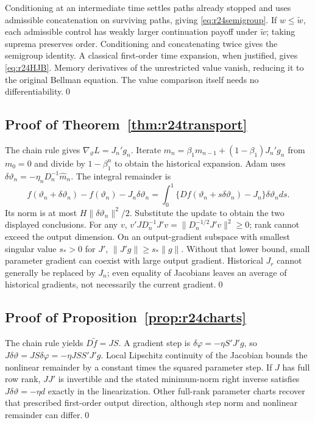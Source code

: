 Conditioning at an intermediate time settles paths already stopped and uses admissible concatenation on surviving paths, giving \eqref{eq:r24semigroup}. If $w\leq\widetilde w$, each admissible control has weakly larger continuation payoff under $\widetilde w$; taking suprema preserves order. Conditioning and concatenating twice gives the semigroup identity. A classical first-order time expansion, when justified, gives \eqref{eq:r24HJB}. Memory derivatives of the unrestricted value vanish, reducing it to the original Bellman equation. The value comparison itself needs no differentiability.\qed

\subsection{Proof of Theorem~\ref{thm:r24transport}}
The chain rule gives $\nabla_\vartheta L=J_n'g_n$. Iterate $m_n=\beta_1m_{n-1}+(1-\beta_1)J_n'g_n$ from $m_0=0$ and divide by $1-\beta_1^n$ to obtain the historical expansion. Adam uses $\delta\vartheta_n=-\eta_nD_n^{-1}\widehat m_n$. The integral remainder is
\[
 f(\vartheta_n+\delta\vartheta_n)-f(\vartheta_n)-J_n\delta\vartheta_n
 =\int_0^1\{Df(\vartheta_n+s\delta\vartheta_n)-J_n\}\delta\vartheta_n ds.
\]
Its norm is at most $H\|\delta\vartheta_n\|^2/2$. Substitute the update to obtain the two displayed conclusions. For any $v$, $v'JD_n^{-1}J'v=\|D_n^{-1/2}J'v\|^2\geq0$; rank cannot exceed the output dimension. On an output-gradient subspace with smallest singular value $s_*>0$ for $J'$, $\|J'g\|\geq s_*\|g\|$. Without that lower bound, small parameter gradient can coexist with large output gradient. Historical $J_r$ cannot generally be replaced by $J_n$; even equality of Jacobians leaves an average of historical gradients, not necessarily the current gradient.\qed

\subsection{Proof of Proposition~\ref{prop:r24charts}}
The chain rule yields $D\widetilde f=JS$. A gradient step is $\delta\varphi=-\eta S'J'g$, so $J\delta\vartheta=JS\delta\varphi=-\eta JSS'J'g$. Local Lipschitz continuity of the Jacobian bounds the nonlinear remainder by a constant times the squared parameter step. If $J$ has full row rank, $JJ'$ is invertible and the stated minimum-norm right inverse satisfies $J\delta\vartheta=-\eta d$ exactly in the linearization. Other full-rank parameter charts recover that prescribed first-order output direction, although step norm and nonlinear remainder can differ.\qed


